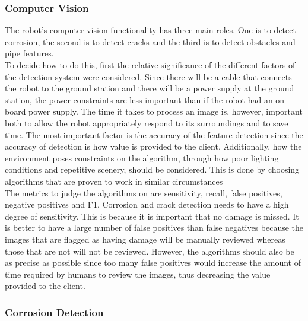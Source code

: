 \documentclass[11pt]{article}		%
\begin{document}
		\subsubsection{Computer Vision}
		
			The robot’s computer vision functionality has three main roles. 
			One is to detect corrosion, the second is to detect cracks and the third is to detect obstacles and pipe features.
			\\
	        To decide how to do this, first the relative significance of the different factors of the detection system were considered. 
	        Since there will be a cable that connects the robot to the ground station and there will be a power supply at the ground station, the power constraints are less important than if the robot had an on board power supply. 
	        The time it takes to process an image is, however, important both to allow the robot appropriately respond to its surroundings and to save time. 
	        The most important factor is the accuracy of the feature detection since the accuracy of detection is how value is provided to the client.
	        Additionally, how the environment poses constraints on the algorithm, through how poor lighting conditions and repetitive scenery, should be considered. This is done by choosing algorithms that are proven to work in similar circumstances
	        \\
	        The metrics to judge the algorithms on are sensitivity, recall, false positives, negative positives and F1.
	        Corrosion and crack detection needs to have a high degree of sensitivity. 
	        This is because it is important that no damage is missed. 
	        It is better to have a large number of false positives than false negatives because the images that are flagged as having damage will be manually reviewed whereas those that are not will not be reviewed. 
	        However, the algorithms should also be as precise as possible since too many false positives would increase the amount of time required by humans to review the images, thus decreasing the value provided to the client.
        
        \subsubsection{Corrosion Detection}
\end{document}
